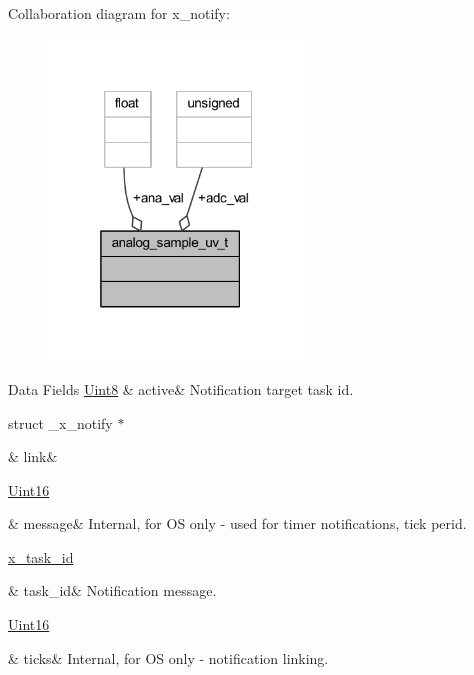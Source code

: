 Collaboration diagram for x\+\_\+notify\+:\nopagebreak
\begin{figure}[H]
\begin{center}
\leavevmode
\includegraphics[width=193pt]{d0/d42/a01707}
\end{center}
\end{figure}
\begin{DoxyFields}{Data Fields}
\hypertarget{a00036_a11c9c2b8514210c037aa45241ca62fb3}{\hyperlink{a00072_af84840501dec18061d18a68c162a8fa2}{Uint8}}\label{a00036_a11c9c2b8514210c037aa45241ca62fb3}
&
active&
Notification target task id. \\
\hline

\hypertarget{a00036_ac1b431c0d2de68ce090f223b32f212b5}{struct \+\_\+x\+\_\+notify $\ast$}\label{a00036_ac1b431c0d2de68ce090f223b32f212b5}
&
link&
\\
\hline

\hypertarget{a00036_adf9665938515a20c283eea2c978cf80d}{\hyperlink{a00072_a59a9f6be4562c327cbfb4f7e8e18f08b}{Uint16}}\label{a00036_adf9665938515a20c283eea2c978cf80d}
&
message&
Internal, for O\+S only -\/ used for timer notifications, tick perid. \\
\hline

\hypertarget{a00036_a21b41e494a28583d4da10f1afb1c5328}{\hyperlink{a00036_ad5c3c5fbfd3e4aadf22830395484a71d}{x\+\_\+task\+\_\+id}}\label{a00036_a21b41e494a28583d4da10f1afb1c5328}
&
task\+\_\+id&
Notification message. \\
\hline

\hypertarget{a00036_aca39a8370fadb7fdd20300deef646d8b}{\hyperlink{a00072_a59a9f6be4562c327cbfb4f7e8e18f08b}{Uint16}}\label{a00036_aca39a8370fadb7fdd20300deef646d8b}
&
ticks&
Internal, for O\+S only -\/ notification linking. \\
\hline

\end{DoxyFields}



